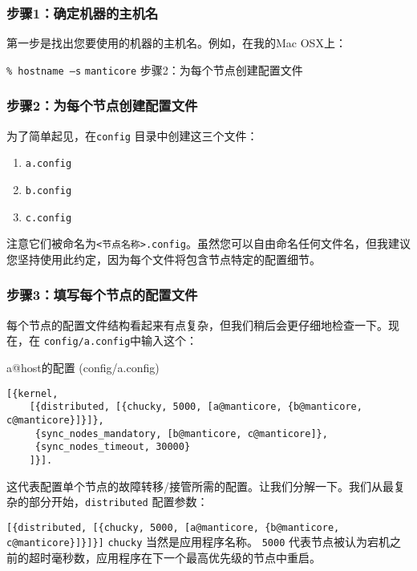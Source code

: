 \subsubsection{步骤1：确定机器的主机名}

第一步是找出您要使用的机器的主机名。例如，在我的Mac OSX上：

\texttt{\% hostname –s}
\texttt{manticore} 步骤2：为每个节点创建配置文件

\subsubsection{步骤2：为每个节点创建配置文件}

为了简单起见，在\texttt{config} 目录中创建这三个文件：

\begin{enumerate}
	\item \texttt{a.config}
  \item \texttt{b.config}
  \item \texttt{c.config}
\end{enumerate}

注意它们被命名为\texttt{<节点名称>.config}。虽然您可以自由命名任何文件名，但我建议您坚持使用此约定，因为每个文件将包含节点特定的配置细节。

\subsubsection{步骤3：填写每个节点的配置文件}

每个节点的配置文件结构看起来有点复杂，但我们稍后会更仔细地检查一下。现在，在
\texttt{config/a.config}中输入这个：


\begin{code}{a@host的配置 (config/a.config)}
\begin{verbatim}
[{kernel, 
    [{distributed, [{chucky, 5000, [a@manticore, {b@manticore, c@manticore}]}]}, 
     {sync_nodes_mandatory, [b@manticore, c@manticore]}, 
     {sync_nodes_timeout, 30000}
    ]}].
\end{verbatim}
\label{lst:a_host_config}
\end{code}


这代表配置单个节点的故障转移/接管所需的配置。让我们分解一下。我们从最复杂的部分开始，\texttt{distributed} 配置参数：

\texttt{[\{distributed, [\{chucky, 5000, [a@manticore, \{b@manticore, c@manticore\}]\}]\}]}
\texttt{chucky} 当然是应用程序名称。
\texttt{5000}
代表节点被认为宕机之前的超时毫秒数，应用程序在下一个最高优先级的节点中重启。

